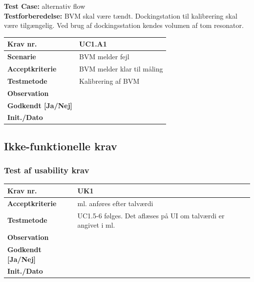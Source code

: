 		
\pagebreak
\textbf{Test Case:} alternativ flow\\
\textbf{Testforberedelse:} BVM skal være tændt. Dockingstation til kalibrering skal være tilgængelig. Ved brug af dockingsstation kendes volumen af tom resonator. \\


\begin{tabularx}{1\textwidth}{|l|X|}
\hline
\textbf{Krav nr.}              & UC1.A1  \\ 
\hline
\textbf{Scenarie}              & BVM melder fejl  \\ \hline
\textbf{Acceptkriterie}        & BVM melder klar til måling\\ \hline
\textbf{Testmetode}            & Kalibrering af BVM \\ \hline
\textbf{Observation}           &  \\ \hline
\textbf{Godkendt {[}Ja/Nej{]}} &  \\ \hline
\textbf{Init./Dato}            &  \\ \hline
\end{tabularx}




\subsection{Ikke-funktionelle krav}

\vspace{5mm}

\subsubsection{Test af usability krav}

\begin{tabularx}{1\textwidth}{|l|X|}
\hline
\textbf{Krav nr.}              & UK1  \\ \hline
\textbf{Acceptkriterie}        & ml. anføres efter talværdi \\ \hline
\textbf{Testmetode}            & UC1.5-6 følges. Det aflæses på UI om talværdi er angivet i ml.  \\ \hline
\textbf{Observation}           &  \\ \hline
\textbf{Godkendt {[}Ja/Nej{]}} &  \\ \hline
\textbf{Init./Dato}            &  \\ \hline
\end{tabularx}

